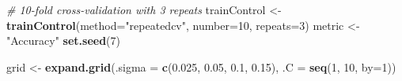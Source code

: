 \documentclass[]{book}
\newenvironment{Shaded}{\begin{snugshade}}{\end{snugshade}}
\newcommand{\CommentTok}[1]{\textcolor[rgb]{0.56,0.35,0.01}{\textit{#1}}}
\newcommand{\DataTypeTok}[1]{\textcolor[rgb]{0.13,0.29,0.53}{#1}}
\newcommand{\DecValTok}[1]{\textcolor[rgb]{0.00,0.00,0.81}{#1}}
\newcommand{\FloatTok}[1]{\textcolor[rgb]{0.00,0.00,0.81}{#1}}
\newcommand{\KeywordTok}[1]{\textcolor[rgb]{0.13,0.29,0.53}{\textbf{#1}}}
\newcommand{\NormalTok}[1]{#1}
\newcommand{\StringTok}[1]{\textcolor[rgb]{0.31,0.60,0.02}{#1}}
\begin{document}
\begin{Shaded}
\begin{Highlighting}[]
\CommentTok{# 10-fold cross-validation with 3 repeats}
\NormalTok{trainControl <-}\StringTok{ }\KeywordTok{trainControl}\NormalTok{(}\DataTypeTok{method=}\StringTok{"repeatedcv"}\NormalTok{, }\DataTypeTok{number=}\DecValTok{10}\NormalTok{, }\DataTypeTok{repeats=}\DecValTok{3}\NormalTok{)}
\NormalTok{metric <-}\StringTok{ "Accuracy"}
\KeywordTok{set.seed}\NormalTok{(}\DecValTok{7}\NormalTok{)}

\NormalTok{grid <-}\StringTok{ }\KeywordTok{expand.grid}\NormalTok{(}\DataTypeTok{.sigma =} \KeywordTok{c}\NormalTok{(}\FloatTok{0.025}\NormalTok{, }\FloatTok{0.05}\NormalTok{, }\FloatTok{0.1}\NormalTok{, }\FloatTok{0.15}\NormalTok{), }
                    \DataTypeTok{.C =} \KeywordTok{seq}\NormalTok{(}\DecValTok{1}\NormalTok{, }\DecValTok{10}\NormalTok{, }\DataTypeTok{by=}\DecValTok{1}\NormalTok{))}


\end{Highlighting}
\end{Shaded}
\end{document}
